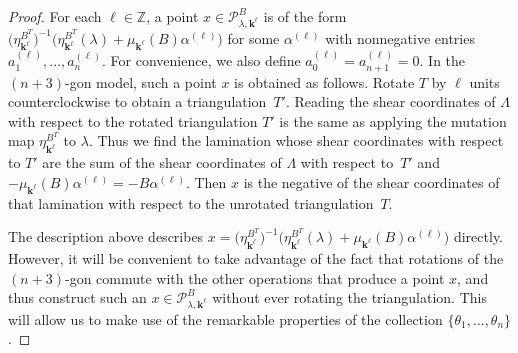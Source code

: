 \documentclass{amsart}
\theoremstyle{definition}
\theoremstyle{remark}
\numberwithin{equation}{section}
\newcommand{\integers}{\mathbb Z}
\newcommand{\set}[1]{{\lbrace #1 \rbrace}}
\newcommand{\0}{{\mathbf{0}}}
\newcommand{\kk}{{\boldsymbol{k}}}
\renewcommand{\P}{\mathcal{P}}
\begin{document}
\begin{proof}
For each $\ell\in\integers$, a point $x\in \P^B_{\lambda,\kk^\ell}$ is of the form $\bigl(\eta_{\kk^\ell}^{B^T}\bigr)^{-1}\bigl(\eta_{\kk^\ell}^{B^T}(\lambda)+\mu_{\kk^\ell}(B)\alpha^{(\ell)}\bigr)$ for some $\alpha^{(\ell)}$ with nonnegative entries $a_1^{(\ell)},\ldots,a_n^{(\ell)}$.
For convenience, we also define $a_0^{(\ell)}=a_{n+1}^{(\ell)}=0$.
In the $(n+3)$-gon model, such a point $x$ is obtained as follows.
Rotate $T$ by $\ell$ units counterclockwise to obtain a triangulation~$T'$.
Reading the shear coordinates of $\Lambda$ with respect to the rotated triangulation $T'$ is the same as applying the mutation map $\eta^{B^T}_{\kk^\ell}$ to $\lambda$.
Thus we find the lamination whose shear coordinates with respect to $T'$ are the sum of the shear coordinates of $\Lambda$ with respect to~$T'$ and $-\mu_{\kk^\ell}(B)\alpha^{(\ell)}=-B\alpha^{(\ell)}$.
Then $x$ is the negative of the shear coordinates of that lamination with respect to the unrotated triangulation~$T$.

The description above describes ${x=\bigl(\eta_{\kk^\ell}^{B^T}\bigr)^{-1}\bigl(\eta_{\kk^\ell}^{B^T}(\lambda)+\mu_{\kk^\ell}(B)\alpha^{(\ell)}}\bigr)$ directly.
However, it will be convenient to take advantage of the fact that rotations of the $(n+3)$-gon commute with the other operations that produce a point $x$, and thus construct such an $x\in \P^B_{\lambda,\kk^\ell}$ without ever rotating the triangulation.
This will allow us to make use of the remarkable properties of the collection $\set{\theta_1,\ldots,\theta_n}$.


\end{proof}
\end{document}
